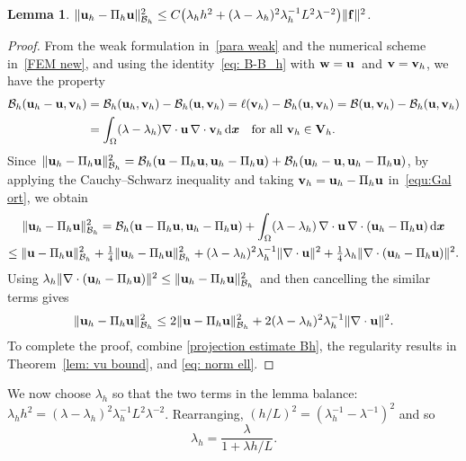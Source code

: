 \documentclass[11pt]{article}
\newcommand{\calB}{\mathcal{B}}
\newcommand{\vf}{{\bf f}}
\newcommand{\vu}{{\bf u}}
\newcommand{\vv}{{\bf v}}
\newcommand{\vV}{{\bf V}}
\newcommand{\vw}{{\bf w}}
\newcommand{\bsx}{{\boldsymbol{x}}}
\numberwithin{equation}{section}
\newcommand{\ud}{\mathrm{d}}
\newtheorem{lemma}[theorem]{Lemma}
\begin{document}
\begin{lemma}\label{lem: balance terms}
$\|\vu_h-\Pi_h \vu\|_{\calB_h}^2\le C\bigl(\lambda_h h^2
    +(\lambda-\lambda_h)^2\lambda_h^{-1}L^2\lambda^{-2}\bigr)\|\vf\|^2$.
\end{lemma}
\begin{proof}
From the weak formulation in~\eqref{para weak} and the numerical scheme
in~\eqref{FEM new}, and using the identity~\eqref{eq: B-B_h} with $\vw=\vu$~and
$\vv=\vv_h$, we have the property
\begin{align}\label{equ:Gal ort}
\calB_h(\vu_h-\vu, \vv_h) &=\calB_h(\vu_h,\vv_h)-\calB_h(\vu,\vv_h)
    =\ell(\vv_h)-\calB_h(\vu,\vv_h)
    =\calB(\vu,\vv_h)-\calB_h(\vu,\vv_h)  \nonumber \\
    &=\int_\Omega(\lambda-\lambda_h)\nabla\cdot\vu\,\nabla\cdot\vv_h\,\ud\bsx
\quad\text{for all $\vv_h \in \vV_h$.}
\end{align}
Since $\|\vu_h-\Pi_h \vu\|_{\calB_h}^2=\calB_h(\vu-\Pi_h\vu,\vu_h-\Pi_h\vu)
+\calB_h(\vu_h-\vu,\vu_h-\Pi_h\vu)$, by applying the Cauchy--Schwarz inequality
and taking $\vv_h=\vu_h-\Pi_h\vu$ in~\eqref{equ:Gal ort}, we obtain
\begin{multline*}
\|\vu_h-\Pi_h \vu\|_{\calB_h}^2=\calB_h(\vu-\Pi_h\vu,\vu_h-\Pi_h\vu)
    +\int_\Omega(\lambda-\lambda_h)\,\nabla\cdot\vu\,\nabla\cdot
    (\vu_h-\Pi_h\vu)\,\ud\bsx\\
    \le\|\vu-\Pi_h\vu\|_{\calB_h}^2+\tfrac14\|\vu_h-\Pi_h \vu\|_{\calB_h}^2
    +(\lambda-\lambda_h)^2\lambda_h^{-1}\|\nabla\cdot\vu\|^2
    +\tfrac{1}{4}\lambda_h\|\nabla\cdot(\vu_h-\Pi_h\vu)\|^2.
\end{multline*}
Using $\lambda_h\|\nabla\cdot(\vu_h-\Pi_h\vu)\|^2
\le\|\vu_h-\Pi_h\vu\|_{\calB_h}^2$ and then cancelling the similar terms gives
\[
\|\vu_h-\Pi_h\vu\|_{\calB_h}^2\le2\|\vu-\Pi_h\vu\|_{\calB_h}^2
    +2(\lambda-\lambda_h)^2\lambda_h^{-1}\|\nabla\cdot\vu\|^2.
\]
To complete the proof, combine \eqref{projection estimate Bh}, the regularity
results in Theorem~\ref{lem: vu bound}, and \eqref{eq: norm ell}.
\end{proof}

We now choose $\lambda_h$ so that the two terms in the lemma balance:
$\lambda_hh^2=(\lambda-\lambda_h)^2\lambda_h^{-1}L^2\lambda^{-2}$.
Rearranging, $(h/L)^2=(\lambda_h^{-1}-\lambda^{-1})^2$ and so
\begin{equation}\label{eq: lambda_h}
\lambda_h=\frac{\lambda}{1+\lambda h/L}.
\end{equation}
\end{document}

